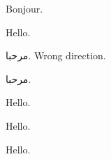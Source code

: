 \documentclass{article}
\begin{document}
\centering

\foreignlanguage{french}{Bonjour.}

Hello.

\foreignlanguage{arabic}{مرحبا.} Wrong direction.

\textarabic{مرحبا.}

Hello.

\textenglish{Hello.}

Hello.
\end{document}
